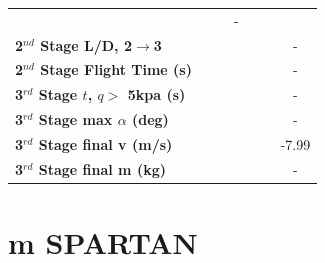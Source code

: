 \begin{table}[ht]
\begin{tabular}{l c c c c c c}
		& \secondthirdSeparationqCdOneHundredFive
		& \secondthirdSeparationqCdOneHundredTen
		& -
		\\
		\textbf{2$^{nd}$ Stage L/D, 2$\rightarrow$3}
		& \secondthirdSeparationLDCdNinety
		& \secondthirdSeparationLDCdNinetyFive
		& \secondthirdSeparationLDCdStandard
		& \secondthirdSeparationLDCdOneHundredFive
		& \secondthirdSeparationLDCdOneHundredTen
		& -
		\\
		\textbf{2$^{nd}$ Stage Flight Time (s)}
		& \secondFlightTimeCdNinety
		& \secondFlightTimeCdNinetyFive
		& \secondFlightTimeCdStandard
		& \secondFlightTimeCdOneHundredFive
		& \secondFlightTimeCdOneHundredTen
		& -
		\\
		\textbf{3$^{rd}$ Stage $t$, $q >$ 5kpa (s)}
		& \thirdqOverFiveCdNinety
		& \thirdqOverFiveCdNinetyFive
		& \thirdqOverFiveCdStandard
		& \thirdqOverFiveCdOneHundredFive
		& \thirdqOverFiveCdOneHundredTen
		& -
		\\
		\textbf{3$^{rd}$ Stage max $\alpha$ (deg)}
		& \thirdmaxAoACdNinety
		& \thirdmaxAoACdNinetyFive
		& \thirdmaxAoACdStandard
		& \thirdmaxAoACdOneHundredFive
		& \thirdmaxAoACdOneHundredTen
		& -
		\\
		\textbf{3$^{rd}$ Stage final v (m/s)}
		& \thirdcircvCdNinety
		& \thirdcircvCdNinetyFive
		& \thirdcircvCdStandard
		& \thirdcircvCdOneHundredFive
		& \thirdcircvCdOneHundredTen
		&-7.99
		\\
		\textbf{3$^{rd}$ Stage final m (kg)}
		& \thirdcircmCdNinety
		& \thirdcircmCdNinetyFive
		& \thirdcircmCdStandard
		& \thirdcircmCdOneHundredFive
		& \thirdcircmCdOneHundredTen
		& -
		\\
		\hline 
	\end{tabular} 
\end{table}


\section{m SPARTAN}


